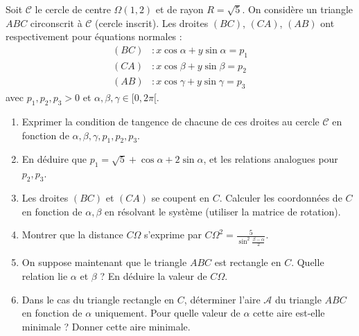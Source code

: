 \documentclass[11pt]{article}
\begin{document}
\begin{exercice}
Soit $\mathcal{C}$ le cercle de centre $\Omega(1, 2)$ et de rayon $R = \sqrt{5}$. On considère un triangle $ABC$ circonscrit à $\mathcal{C}$ (cercle inscrit). Les droites $(BC)$, $(CA)$, $(AB)$ ont respectivement pour équations normales :
\[
\begin{aligned}
(BC) &: x\cos\alpha + y\sin\alpha = p_1 \\
(CA) &: x\cos\beta + y\sin\beta = p_2 \\
(AB) &: x\cos\gamma + y\sin\gamma = p_3
\end{aligned}
\]
avec $p_1, p_2, p_3 > 0$ et $\alpha, \beta, \gamma \in [0, 2\pi[$.
\begin{enumerate}
    \item Exprimer la condition de tangence de chacune de ces droites au cercle $\mathcal{C}$ en fonction de $\alpha, \beta, \gamma, p_1, p_2, p_3$.
    \item En déduire que $p_1 = \sqrt{5} + \cos\alpha + 2\sin\alpha$, et les relations analogues pour $p_2, p_3$.
    \item Les droites $(BC)$ et $(CA)$ se coupent en $C$. Calculer les coordonnées de $C$ en fonction de $\alpha, \beta$ en résolvant le système (utiliser la matrice de rotation).
    \item Montrer que la distance $C\Omega$ s'exprime par $C\Omega^2 = \frac{5}{\sin^2\frac{\beta-\alpha}{2}}$.
    \item On suppose maintenant que le triangle $ABC$ est rectangle en $C$. Quelle relation lie $\alpha$ et $\beta$ ? En déduire la valeur de $C\Omega$.
    \item Dans le cas du triangle rectangle en $C$, déterminer l'aire $\mathcal{A}$ du triangle $ABC$ en fonction de $\alpha$ uniquement. Pour quelle valeur de $\alpha$ cette aire est-elle minimale ? Donner cette aire minimale.
\end{enumerate}
\end{exercice}
\end{document}
